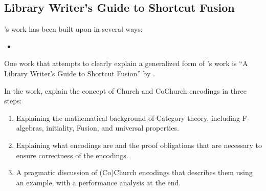 
\subsection{Library Writer's Guide to Shortcut Fusion}
\cite{Gill1993}'s work has been built upon in several ways:

\begin{itemize}
    \item 
\end{itemize}


One work that attempts to clearly explain a generalized form of \cite{Gill1993}'s work is ``A Library Writer's Guide to Shortcut Fusion'' by \cite{Harper2011}.


In the work, \cite{Harper2011} explain the concept of Church and CoChurch encodings in three steps:
\begin{enumerate}
    \item Explaining the mathematical background of Category theory, including F-algebras, initiality, Fusion, and universal properties.
    \item Explaining what encodings are and the proof obligations that are necessary to ensure correctness of the encodings.
    \item A pragmatic discussion of (Co)Church encodings that describes them using an example, with a performance analysis at the end.
\end{enumerate}


